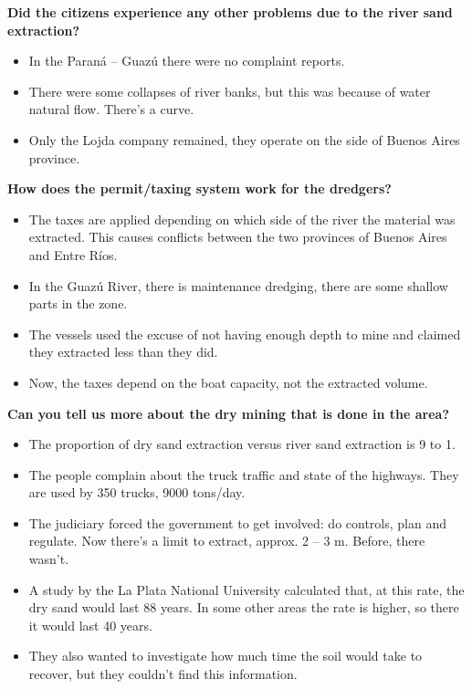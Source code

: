 \textbf{Did the citizens experience any other problems due to the river sand extraction?}
\begin{itemize}
    \item In the Paraná – Guazú there were no complaint reports. 
    \item There were some collapses of river banks, but this was because of water natural flow. There’s a curve. 
    \item Only the Lojda company remained, they operate on the side of Buenos Aires province.
\end{itemize}

\textbf{How does the permit/taxing system work for the dredgers?}
\begin{itemize}
    \item The taxes are applied depending on which side of the river the material was extracted. This causes conflicts between the two provinces of Buenos Aires and Entre Ríos. 
    \item In the Guazú River, there is maintenance dredging, there are some shallow parts in the zone. 
    \item The vessels used the excuse of not having enough depth to mine and claimed they extracted less than they did.
    \item Now, the taxes depend on the boat capacity, not the extracted volume. 
\end{itemize}

\textbf{Can you tell us more about the dry mining that is done in the area?}
\begin{itemize}
    \item The proportion of dry sand extraction versus river sand extraction is 9 to 1.
    \item The people complain about the truck traffic and state of the highways. They are used by 350 trucks, 9000 tons/day.
    \item The judiciary forced the government to get involved: do controls, plan and regulate. Now there’s a limit to extract, approx. 2 – 3 m. Before, there wasn’t. 
    \item A study by the La Plata National University calculated that, at this rate, the dry sand would last 88 years. In some other areas the rate is higher, so there it would last 40 years.
    \item They also wanted to investigate how much time the soil would take to recover, but they couldn't find this information.
\end{itemize}

